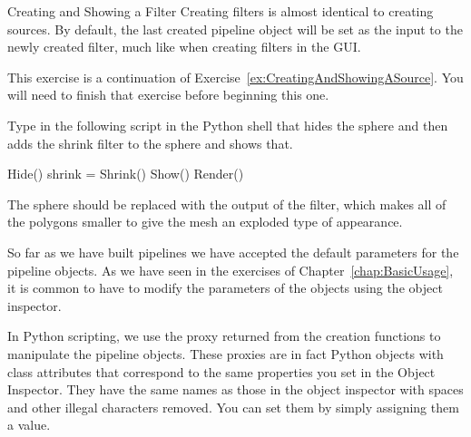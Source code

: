 \begin{exercise}{Creating and Showing a Filter}
  \label{ex:CreatingAndShowingAFilter}%
  Creating filters is almost identical to creating sources.  By default,
  the last created pipeline object will be set as the input to the newly
  created filter, much like when creating filters in the GUI.

  This exercise is a continuation of
  Exercise~\ref{ex:CreatingAndShowingASource}.  You will need to finish
  that exercise before beginning this one.

  Type in the following script in the Python shell that hides the sphere
  and then adds the shrink filter to the sphere and shows that.

  \begin{python}
Hide()
shrink = Shrink()
Show()
Render()
  \end{python}

  The sphere should be replaced with the output of the 
  filter, which makes all of the polygons smaller to give the mesh an
  exploded type of appearance.
\end{exercise}

So far as we have built pipelines we have accepted the default parameters
for the pipeline objects.  As we have seen in the exercises of
Chapter~\ref{chap:BasicUsage}, it is common to have to modify the
parameters of the objects using the object inspector.

In Python scripting, we use the proxy returned from the creation functions
to manipulate the pipeline objects.  These proxies are in fact Python
objects with class attributes that correspond to the same properties you
set in the Object Inspector.  They have the same names as those in the
object inspector with spaces and other illegal characters removed.  You can
set them by simply assigning them a value.

